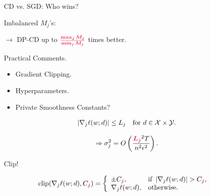 \documentclass{beamer}
\begin{document}
\begin{frame}

  \vspace{2em}
  {
    \Huge\centering
    CD vs. SGD: Who wins?
  }
  \vspace{1em}

  Imbalanced $M_j$'s:

  {\centering $\rightarrow$ DP-CD up to $\emphcol{\frac{\max_j M_j}{\min_j M_j}}$ times better.}
  \vspace{1em}

\end{frame}

\begin{frame}
  \vspace{2em}
  \Huge\centering
  Practical Comments.

  \vspace{1em}

  \LARGE
  \begin{itemize}
  \item Gradient Clipping.
  \item Hyperparameters.
  \item Private Smoothness Constants?
  \end{itemize}
\end{frame}

\begin{frame}
  \begin{align*}
    \displaystyle \left| \nabla_j \ell(w; d) \right| \le L_j \text{\quad for $d \in \mathcal{X}\times\mathcal{Y}$}.
  \end{align*}

  \pause

  \begin{align*}
    \Rightarrow \sigma_j^2 = O\left( \frac{\emphcol{L_j}^2 T}{n^2\epsilon^2} \right).
  \end{align*}
\end{frame}

\begin{frame}
  {\Huge
    \begin{center}
      Clip!
    \end{center}
  }
  \vspace{-0.5em}
  {\Large
    \begin{align*}
      \!\!\!\!\clip(\nabla_j \ell(w;d), C_{\emphcol{j}}) = \twopartdef
      {\pm C_{\emphcol{j}}}{\text{if }\abs{\nabla_j \ell(w;d)} > C_{\emphcol{j}},}
      {\nabla_j \ell(w; d)}{\text{otherwise.}}
    \end{align*}
  }

  \pause

  \vspace{-1em}


\end{frame}
\end{document}
